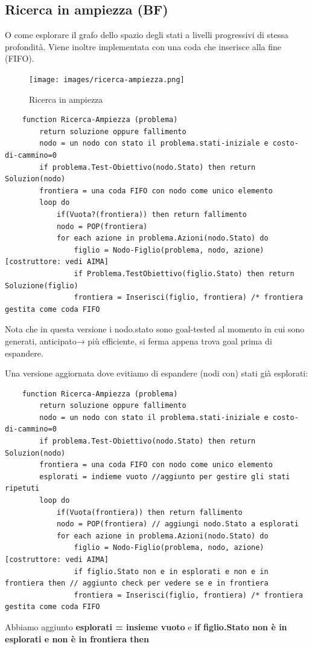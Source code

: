 \subsection{Ricerca in ampiezza (BF)}
O come esplorare il grafo dello spazio degli stati a livelli progressivi di stessa profondità. Viene inoltre
implementata con una coda che inserisce alla fine (FIFO).
\begin{figure}[h!]
	\centering
	\texttt{[image: images/ricerca-ampiezza.png]}
	\caption{Ricerca in ampiezza}
\end{figure}
\begin{lstlisting}
	function Ricerca-Ampiezza (problema)
		return soluzione oppure fallimento
		nodo = un nodo con stato il problema.stati-iniziale e costo-di-cammino=0
		if problema.Test-Obiettivo(nodo.Stato) then return Soluzion(nodo)
		frontiera = una coda FIFO con nodo come unico elemento
		loop do
			if(Vuota?(frontiera)) then return fallimento
			nodo = POP(frontiera)
			for each azione in problema.Azioni(nodo.Stato) do
				figlio = Nodo-Figlio(problema, nodo, azione) [costruttore: vedi AIMA]
				if Problema.TestObiettivo(figlio.Stato) then return Soluzione(figlio)
				frontiera = Inserisci(figlio, frontiera) /* frontiera gestita come coda FIFO
\end{lstlisting}
\begin{note}
	Nota che in questa versione i nodo.stato sono goal-tested al momento in cui sono generati, anticipato→ più efficiente, si ferma appena trova goal prima di espandere.
\end{note}
Una versione aggiornata dove evitiamo di espandere (nodi con) stati già esplorati:
\begin{lstlisting}
	function Ricerca-Ampiezza (problema)
		return soluzione oppure fallimento
		nodo = un nodo con stato il problema.stati-iniziale e costo-di-cammino=0
		if problema.Test-Obiettivo(nodo.Stato) then return Soluzion(nodo)
		frontiera = una coda FIFO con nodo come unico elemento
		esplorati = indieme vuoto //aggiunto per gestire gli stati ripetuti
		loop do
			if(Vuota(frontiera)) then return fallimento
			nodo = POP(frontiera) // aggiungi nodo.Stato a esplorati
			for each azione in problema.Azioni(nodo.Stato) do
				figlio = Nodo-Figlio(problema, nodo, azione) [costruttore: vedi AIMA]
				if figlio.Stato non e in esplorati e non e in frontiera then // aggiunto check per vedere se e in frontiera
				frontiera = Inserisci(figlio, frontiera) /* frontiera gestita come coda FIFO
\end{lstlisting}
Abbiamo aggiunto \textbf{esplorati = insieme vuoto} e \textbf{if figlio.Stato non è in esplorati e non è in frontiera then} 
